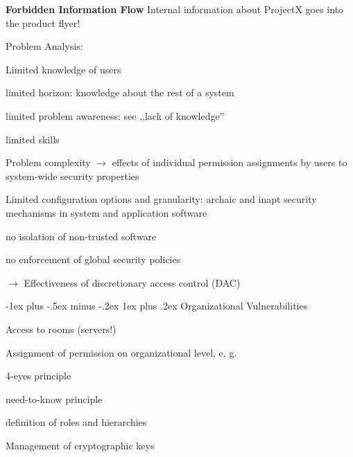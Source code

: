 \documentclass[a4paper]{article}
\makeatletter
\renewcommand{\note}[2]{\begin{noteBox} \textbf{#1} #2 \end{noteBox}}
\renewcommand{\subsubsection}{\@startsection{subsubsection}{3}{0mm}%
                {-1ex plus -.5ex minus -.2ex}%
                {1ex plus .2ex}%
                {\normalfont\small\bfseries}}
\makeatother
\begin{document}
\begin{multicols}{3}
    \note{Forbidden Information Flow}{Internal information about ProjectX goes into the product flyer!}

    Problem Analysis:
    \begin{itemize*}
        \item Limited knowledge of users
        \begin{itemize*}
            \item limited horizon: knowledge about the rest of a system
            \item limited problem awareness: see ,,lack of knowledge''
            \item limited skills
        \end{itemize*}
        \item Problem complexity $\rightarrow$ effects of individual permission assignments by users to system-wide security properties
        \item Limited configuration options and granularity: archaic and inapt security mechanisms in system and application software
        \begin{itemize*}
            \item no isolation of non-trusted software
            \item no enforcement of global security policies
        \end{itemize*}
        \item[$\rightarrow$] Effectiveness of discretionary access control (DAC)
    \end{itemize*}

    \subsubsection{Organizational Vulnerabilities}
    \begin{itemize*}
        \item Access to rooms (servers!)
        \item Assignment of permission on organizational level, e. g.
        \begin{itemize*}
            \item 4-eyes principle
            \item need-to-know principle
            \item definition of roles and hierarchies
        \end{itemize*}
        \item Management of cryptographic keys
    \end{itemize*}


\end{multicols}
\end{document}
